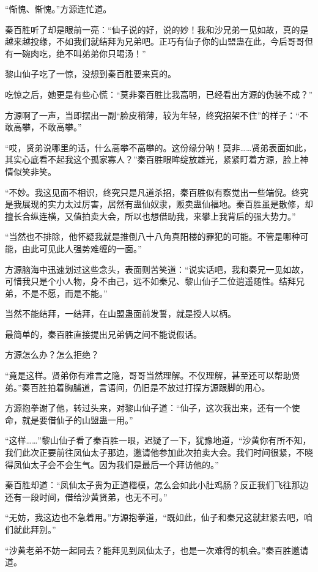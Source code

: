 \begin{this_body}
“惭愧、惭愧。”方源连忙道。

秦百胜听了却是眼前一亮：“仙子说的好，说的妙！我和沙兄弟一见如故，真的是越来越投缘，不如我们就结拜为兄弟吧。正巧有仙子你的山盟蛊在此，今后哥哥但有一碗肉吃，绝不叫弟弟你只喝汤！”

黎山仙子吃了一惊，没想到秦百胜要来真的。

吃惊之后，她更是有些心慌：“莫非秦百胜比我高明，已经看出方源的伪装不成？”

方源啊了一声，当即摆出一副“脸皮稍薄，较为年轻，终究招架不住”的样子：“不敢高攀，不敢高攀。”

“哎，贤弟说哪里的话，什么高攀不高攀的。这份缘分呐！莫非……贤弟表面如此，其实心底看不起我这个孤家寡人？”秦百胜眼眸绽放雄光，紧紧盯着方源，脸上神情似笑非笑。

“不妙。我这见面不相识，终究只是凡道杀招，秦百胜似有察觉出一些端倪。终究是我展现的实力太过厉害，居然有蛊仙奴隶，贩卖蛊仙福地。秦百胜虽是散修，却擅长合纵连横，又值拍卖大会，所以也想借助我，来攀上我背后的强大势力。”

“当然也不排除，他怀疑我就是推倒八十八角真阳楼的罪犯的可能。不管是哪种可能，由此可见此人强势难缠的一面。”

方源脑海中迅速划过这些念头，表面则苦笑道：“说实话吧，我和秦兄一见如故，可惜我只是个小人物，身不由己，远不如秦兄、黎山仙子二位逍遥随性。结拜兄弟，不是不愿，而是不能。”

当然不能结拜，一结拜，在山盟蛊面前发誓，就是授人以柄。

最简单的，秦百胜直接提出兄弟俩之间不能说假话。

方源怎么办？怎么拒绝？

“竟是这样。贤弟你有难言之隐，哥哥当然理解。不仅理解，甚至还可以帮助贤弟。”秦百胜拍着胸脯道，言语间，仍旧是不放过打探方源跟脚的用心。

方源抱拳谢了他，转过头来，对黎山仙子道：“仙子，这次我出来，还有一个使命，就是要借仙子的山盟蛊一用。”

“这样……”黎山仙子看了秦百胜一眼，迟疑了一下，犹豫地道，“沙黄你有所不知，我们此次正要前往凤仙太子那边，邀请他参加此次拍卖大会。我们时间很紧，不晓得凤仙太子会不会生气。因为我们是最后一个拜访他的。”

秦百胜却道：“凤仙太子贵为正道楷模，怎么会如此小肚鸡肠？反正我们飞往那边还有一段时间，借给沙黄贤弟，也无不可。”

“无妨，我这边也不急着用。”方源抱拳道，“既如此，仙子和秦兄这就赶紧去吧，咱们就此拜别。”

“沙黄老弟不妨一起同去？能拜见到凤仙太子，也是一次难得的机会。”秦百胜邀请道。


\end{this_body}
